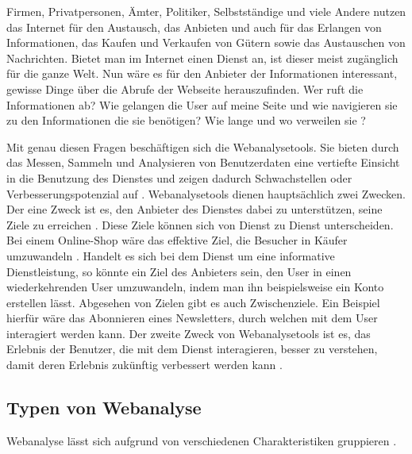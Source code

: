 Firmen, Privatpersonen, Ämter, Politiker, Selbstständige und viele Andere nutzen das Internet für den Austausch, das Anbieten und auch für das Erlangen von Informationen, das Kaufen und Verkaufen von Gütern sowie das Austauschen von Nachrichten. Bietet man im Internet einen Dienst an, ist dieser meist zugänglich für die ganze Welt. Nun wäre es für den Anbieter der Informationen interessant, gewisse Dinge über die Abrufe der Webseite herauszufinden. Wer ruft die Informationen ab? Wie gelangen die User auf meine Seite und wie navigieren sie zu den Informationen die sie benötigen? Wie lange und wo verweilen sie \parencite[S. 175]{nakatani2011toolselectionmethod}?

Mit genau diesen Fragen beschäftigen sich die Webanalysetools. Sie bieten durch das Messen, Sammeln und Analysieren von Benutzerdaten eine vertiefte Einsicht in die Benutzung des Dienstes und zeigen dadurch Schwachstellen oder Verbesserungspotenzial auf \parencite[S. 1]{waisberg2009webShort}. 
Webanalysetools dienen hauptsächlich zwei Zwecken. Der eine Zweck ist es, den Anbieter des Dienstes dabei zu unterstützen, seine Ziele zu erreichen \parencite[S. 56]{AnalyticsForDummies}. Diese Ziele können sich von Dienst zu Dienst unterscheiden. Bei einem Online-Shop wäre das effektive Ziel, die Besucher in Käufer umzuwandeln \parencite[S. 28]{AnalyticsForDummies}. Handelt es sich bei dem Dienst um eine informative Dienstleistung, so könnte ein Ziel des Anbieters sein, den User in einen wiederkehrenden User umzuwandeln, indem man ihn beispielsweise ein Konto erstellen lässt. Abgesehen von Zielen gibt es auch Zwischenziele. Ein Beispiel hierfür wäre das Abonnieren eines Newsletters, durch welchen mit dem User interagiert werden kann. Der zweite Zweck von Webanalysetools ist es, das Erlebnis der Benutzer, die mit dem Dienst interagieren, besser zu verstehen, damit deren Erlebnis zukünftig verbessert werden kann \parencite[S. 1]{waisberg2009webShort}.

\subsection{Typen von Webanalyse}

Webanalyse lässt sich aufgrund von verschiedenen Charakteristiken gruppieren \parencite[S. 172-174]{nakatani2011toolselectionmethod}.

